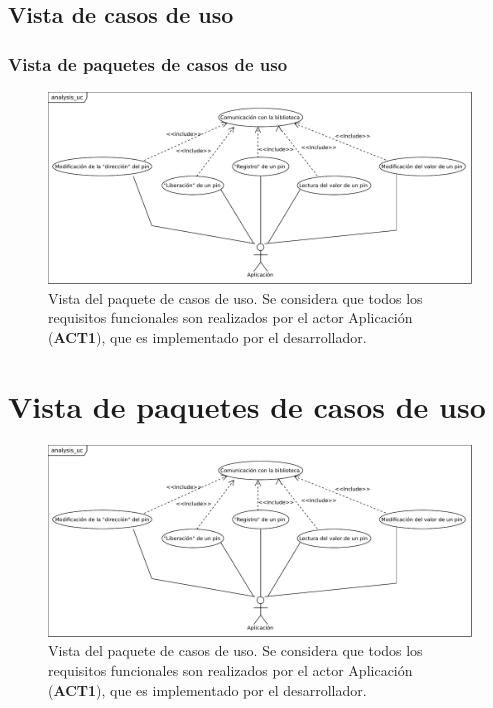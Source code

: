 \documentclass[letterpaper,10pt,spanish]{sphinxmanual}
\begin{document}
\section{Vista de casos de uso}
\label{analysis/fr:vista-de-casos-de-uso}

\subsection{Vista de paquetes de casos de uso}
\label{analysis/uc::doc}\label{analysis/uc:vista-de-paquetes-de-casos-de-uso}\begin{figure}[htbp]
\centering
\capstart

\includegraphics{analysis_uc.pdf}
\caption{Vista del paquete de casos de uso. Se considera que todos los requisitos funcionales son realizados por el actor Aplicación (\textbf{ACT1}), que es implementado por el desarrollador.}\end{figure}


\chapter{Vista de paquetes de casos de uso}
\label{analysis/uc::doc}\label{analysis/uc:vista-de-paquetes-de-casos-de-uso}\begin{figure}[htbp]
\centering
\capstart

\includegraphics{analysis_uc.pdf}
\caption{Vista del paquete de casos de uso. Se considera que todos los requisitos funcionales son realizados por el actor Aplicación (\textbf{ACT1}), que es implementado por el desarrollador.}\end{figure}
\end{document}
